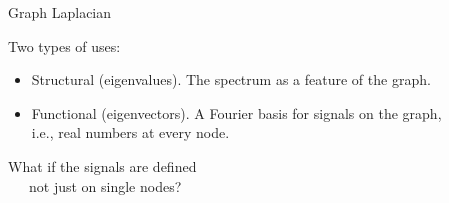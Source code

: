 \documentclass[10pt,t, handout]{beamer} %
\begin{document}
\begin{frame}{Graph Laplacian}
	\vskip 10pt
	\pause
	
	Two types of uses:
	\begin{itemize}
		\item[] \textcolor{pblue}{Structural (eigenvalues).} The spectrum as a feature of the graph.
		
		\pause
		
		\item[] \textcolor{pblue}{Functional (eigenvectors).} A Fourier basis for signals on the graph, \\ 
		
		\vskip 5pt
		\hspace*{5cm} \pause i.e., real numbers at every node.
	\end{itemize}

	\pause
	
	What if the signals are defined \\
	\textcolor{pblue}{\ \ \ not just on single nodes?}
\end{frame}
\end{document}
